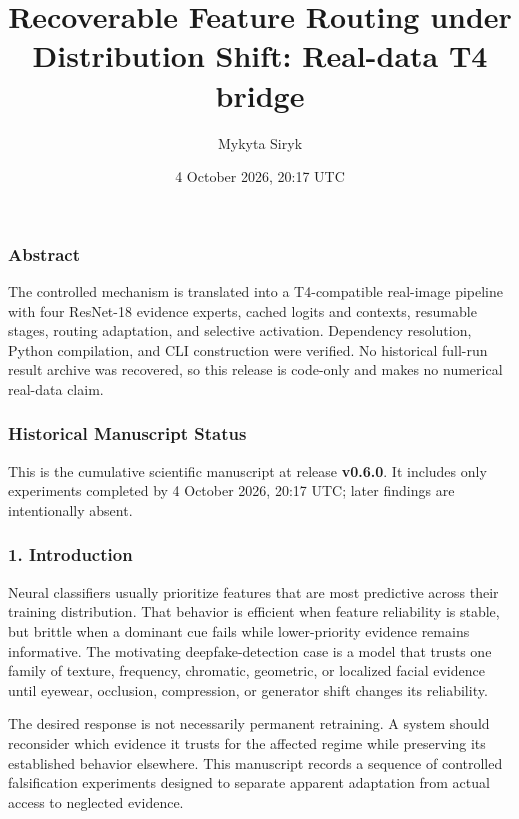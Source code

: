 \documentclass[
  10pt,
]{article}
\title{Recoverable Feature Routing under Distribution Shift: Real-data
T4 bridge}
\author{Mykyta Siryk}
\date{4 October 2026, 20:17 UTC}
\begin{document}
\maketitle

\hypertarget{abstract}{%
\subsubsection{Abstract}\label{abstract}}

The controlled mechanism is translated into a T4-compatible real-image
pipeline with four ResNet-18 evidence experts, cached logits and
contexts, resumable stages, routing adaptation, and selective
activation. Dependency resolution, Python compilation, and CLI
construction were verified. No historical full-run result archive was
recovered, so this release is code-only and makes no numerical real-data
claim.

\hypertarget{historical-manuscript-status}{%
\subsubsection{Historical Manuscript
Status}\label{historical-manuscript-status}}

This is the cumulative scientific manuscript at release \textbf{v0.6.0}.
It includes only experiments completed by 4 October 2026, 20:17 UTC;
later findings are intentionally absent.

\hypertarget{introduction}{%
\subsubsection{1. Introduction}\label{introduction}}

Neural classifiers usually prioritize features that are most predictive
across their training distribution. That behavior is efficient when
feature reliability is stable, but brittle when a dominant cue fails
while lower-priority evidence remains informative. The motivating
deepfake-detection case is a model that trusts one family of texture,
frequency, chromatic, geometric, or localized facial evidence until
eyewear, occlusion, compression, or generator shift changes its
reliability.

The desired response is not necessarily permanent retraining. A system
should reconsider which evidence it trusts for the affected regime while
preserving its established behavior elsewhere. This manuscript records a
sequence of controlled falsification experiments designed to separate
apparent adaptation from actual access to neglected evidence.
\end{document}
